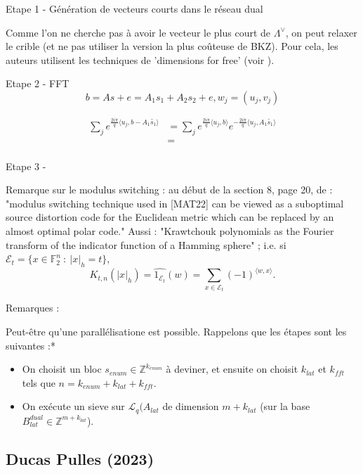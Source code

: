 \documentclass{article}
\newcommand{\ZZ}{\mathbb{Z}}
\newcommand{\LL}{\mathcal{L}}
\begin{document}
Etape 1 - Génération de vecteurs courts dans le réseau dual

Comme l'on ne cherche pas à avoir le vecteur le plus court de $\Lambda^\vee$, on peut relaxer le crible (et ne pas utiliser la version la plus coûteuse de BKZ). Pour cela, les auteurs utilisent les techniques de 'dimensions for free' (voir \cite{ducas2018shortest}). 

Etape 2 - FFT
\[b = As +e = A_1 s_1 + A_2 s_2 + e , w_j = (u_j , v_j)\]

\[\begin{split}
\sum_{j} e^{\frac{2i\pi}{q}\langle u_j , b - A_1\tilde{s_1} \rangle} 
	& = \sum_j e^{\frac{2i\pi}{q}\langle u_j , b\rangle }e^{ - \frac{2i\pi}{q}\langle u_j ,A_1\tilde{s_1} \rangle}\\
	& = \\
\end{split}\]

Etape 3 - 

Remarque sur le modulus switching : au début de la section 8, page 20, de \cite{carrier2024reduction} : "modulus switching technique used in [MAT22] can be viewed as a suboptimal
source distortion code for the Euclidean metric which can be replaced by an almost optimal polar code."
Aussi : "Krawtchouk polynomials as the Fourier transform of the indicator function of a Hamming sphere" ; i.e. si $\mathcal E_t = \{x \in \mathbb F_2^n\ : \ |x|_{h} = t\}$, 
\[K_{t,n}(|x|_h)  = \hat{1_{\mathcal E_t}} (w) = \sum_{x\in \mathcal E_t} (-1)^{\langle w,x \rangle}.\]

Remarques :

Peut-être qu'une parallélisatione est possible. Rappelons que les étapes sont les suivantes :*
\begin{itemize}
	\item On choisit un bloc $s_{enum}\in \ZZ^{k_{enum}}$ à deviner, et ensuite on choisit $k_{lat}$ et $k_{fft}$ tels que $n = k_{enum} + k_{lat} + k_{fft}$. 
	\item On exécute un sieve sur $\LL_{q}(A_{lat}$ de dimension $m+k_{lat}$ (sur la base $B^{dual}_{lat}\in \ZZ^{m+k_{lat}}$). 
	
\end{itemize}

\subsection{Ducas Pulles (2023)}%
\end{document}
